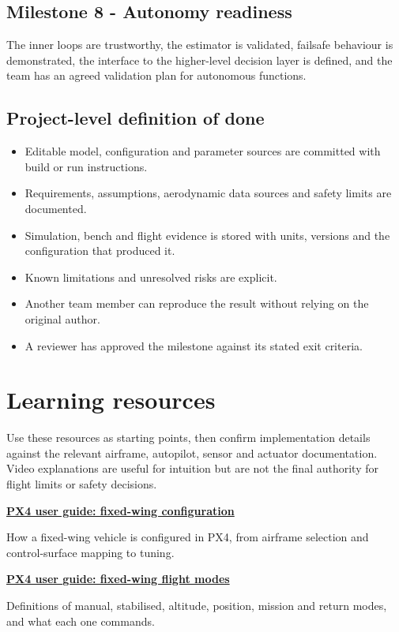 \documentclass[11pt,a4paper]{article}
\newcommand{\Resource}[3]{%
  \begin{resourcebox}
    \href{#2}{\textbf{\color{DARESTeal}#1}}\par
    {\small #3}
  \end{resourcebox}
}
\begin{document}
\subsection{Milestone 8 - Autonomy readiness}
The inner loops are trustworthy, the estimator is validated, failsafe behaviour
is demonstrated, the interface to the higher-level decision layer is defined,
and the team has an agreed validation plan for autonomous functions.

\subsection{Project-level definition of done}
\begin{itemize}
  \item Editable model, configuration and parameter sources are committed with build or run instructions.
  \item Requirements, assumptions, aerodynamic data sources and safety limits are documented.
  \item Simulation, bench and flight evidence is stored with units, versions and the configuration that produced it.
  \item Known limitations and unresolved risks are explicit.
  \item Another team member can reproduce the result without relying on the original author.
  \item A reviewer has approved the milestone against its stated exit criteria.
\end{itemize}

\section{Learning resources}

Use these resources as starting points, then confirm implementation details
against the relevant airframe, autopilot, sensor and actuator documentation.
Video explanations are useful for intuition but are not the final authority for
flight limits or safety decisions.

\Resource
  {PX4 user guide: fixed-wing configuration}
  {https://docs.px4.io/main/en/config_fw/}
  {How a fixed-wing vehicle is configured in PX4, from airframe selection and control-surface mapping to tuning.}

\Resource
  {PX4 user guide: fixed-wing flight modes}
  {https://docs.px4.io/main/en/flight_modes_fw/}
  {Definitions of manual, stabilised, altitude, position, mission and return modes, and what each one commands.}
\end{document}
